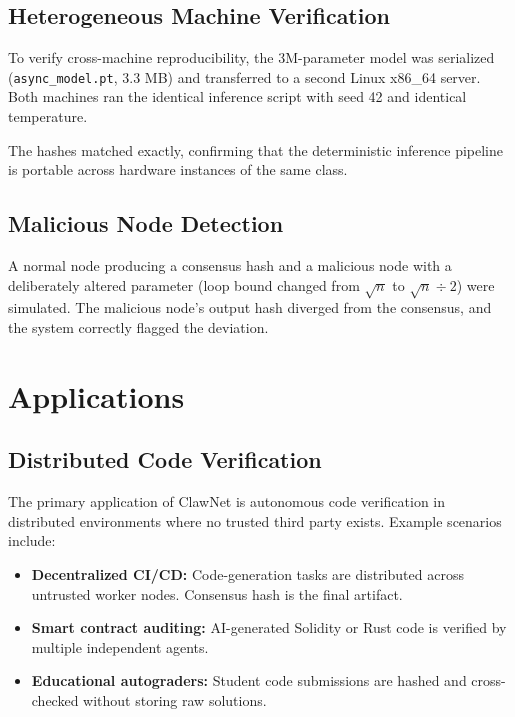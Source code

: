 \documentclass[11pt,a4paper]{article}
\begin{document}
\subsection{Heterogeneous Machine Verification}

To verify cross-machine reproducibility, the 3M-parameter model was
serialized (\texttt{async\_model.pt}, 3.3 MB) and transferred to a
second Linux x86\_64 server. Both machines ran the identical inference
script with seed 42 and identical temperature.

The hashes matched exactly, confirming that the deterministic inference
pipeline is portable across hardware instances of the same class.

\subsection{Malicious Node Detection}

A normal node producing a consensus hash and a malicious node with a
deliberately altered parameter (loop bound changed from $\sqrt{n}$ to
$\sqrt{n} \div 2$) were simulated. The malicious node's output hash
diverged from the consensus, and the system correctly flagged the
deviation.

\section{Applications}
\label{sec:applications}

\subsection{Distributed Code Verification}

The primary application of ClawNet is autonomous code verification in
distributed environments where no trusted third party exists. Example
scenarios include:

\begin{itemize}
    \item \textbf{Decentralized CI/CD:} Code-generation tasks are
          distributed across untrusted worker nodes. Consensus hash is
          the final artifact.
    \item \textbf{Smart contract auditing:} AI-generated Solidity or
          Rust code is verified by multiple independent agents.
    \item \textbf{Educational autograders:} Student code submissions
          are hashed and cross-checked without storing raw solutions.
\end{itemize}
\end{document}
